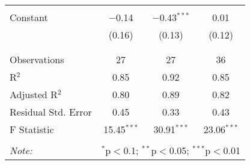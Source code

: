 \begin{table}[!htbp]
\begin{tabular}{@{\extracolsep{5pt}}lccc}
  & & & \\ 
 Constant & $-$0.14 & $-$0.43$^{***}$ & 0.01 \\ 
  & (0.16) & (0.13) & (0.12) \\ 
  & & & \\ 
\hline \\[-1.8ex] 
Observations & 27 & 27 & 36 \\ 
R$^{2}$ & 0.85 & 0.92 & 0.85 \\ 
Adjusted R$^{2}$ & 0.80 & 0.89 & 0.82 \\ 
Residual Std. Error & 0.45 & 0.33 & 0.43 \\ 
F Statistic & 15.45$^{***}$ & 30.91$^{***}$ & 23.06$^{***}$ \\ 
\hline 
\hline \\[-1.8ex] 
\textit{Note:}  & \multicolumn{3}{r}{$^{*}$p$<$0.1; $^{**}$p$<$0.05; $^{***}$p$<$0.01} \\ 
\end{tabular} 
\end{table} 
